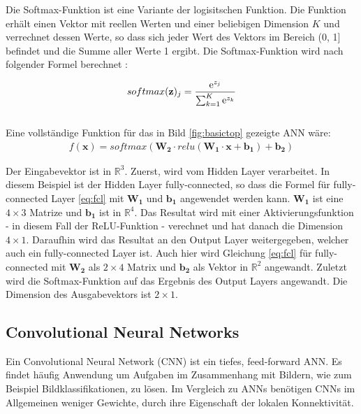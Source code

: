 Die Softmax-Funktion ist eine Variante der logisitschen Funktion. Die Funktion erh\"alt einen Vektor  mit reellen Werten und einer beliebigen Dimension $K$ und verrechnet dessen Werte, so dass sich jeder Wert des Vektors  im Bereich (0, 1] befindet und die Summe aller Werte 1 ergibt. Die Softmax-Funktion wird nach folgender Formel berechnet \parencite{Goodfellow-et-al-2016}:

\begin{equation}
softmax(\textbf{z})_j = \frac{\mathrm{e}^{z_j}}{\sum_{k=1}^K \mathrm{e}^{z_k}}
\end{equation}
\\

Eine vollständige Funktion f\"ur das in Bild \ref{fig:basictop} gezeigte ANN w\"are:
\begin{multline*}
f(\mathbf{x}) = softmax(\mathbf{W_2} \cdot relu(\mathbf{W_1} \cdot \mathbf{x} + \mathbf{b_1}) + \mathbf{b_2} )
\end{multline*}


Der Eingabevektor  ist in $\mathbb{R}^3$. Zuerst, wird  vom Hidden Layer verarbeitet. In diesem Beispiel ist der Hidden Layer fully-connected, so dass die Formel f\"ur fully-connected Layer \ref{eq:fcl} mit $\mathbf{W_1}$ und $\mathbf{b_1}$ angewendet werden kann. $\mathbf{W_1}$ ist eine $4 \times 3$ Matrize und $\mathbf{b_1}$ ist in $\mathbb{R}^4$. Das Resultat wird mit einer Aktivierungsfunktion - in diesem Fall der ReLU-Funktion - verechnet und hat danach die Dimension $4\times1$. Daraufhin wird das Resultat an den Output Layer weitergegeben, welcher auch ein fully-connected Layer ist. Auch hier wird Gleichung \ref{eq:fcl} f\"ur fully-connected mit $\mathbf{W_2}$ als $2\times4$ Matrix und $\mathbf{b_2}$ als Vektor in $\mathbb{R}^2$ angewandt. Zuletzt wird die Softmax-Funktion auf das Ergebnis des Output Layers angewandt. Die Dimension des Ausgabevektors ist $2\times1$.


\subsection{Convolutional Neural Networks}

\label{cnn}

Ein Convolutional Neural Network (CNN) ist ein tiefes, feed-forward ANN. Es findet h\"aufig  Anwendung um Aufgaben im Zusammenhang mit Bildern, wie zum Beispiel Bildklassifikationen, zu l\"osen. Im Vergleich zu ANNs ben\"otigen CNNs im Allgemeinen weniger Gewichte, durch ihre Eigenschaft der lokalen Konnektivit\"at.

